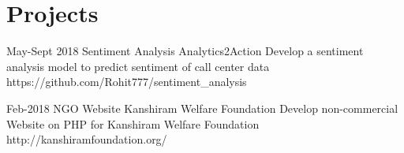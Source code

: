\documentclass[]{cv-style}          %
\begin{document}

\section{Projects}

\begin{entrylist}
\entry
{May-Sept 2018}
{Sentiment Analysis }
{Analytics2Action}
{Develop a sentiment analysis model to predict sentiment of call center data \newline
https://github.com/Rohit777/sentiment\_analysis}
{\vspace{-0.3cm}}
\end{entrylist}

\begin{entrylist}
\entry
{Feb-2018}
{NGO Website}
{Kanshiram Welfare Foundation}
{Develop non-commercial Website on PHP for Kanshiram Welfare Foundation\newline
http://kanshiramfoundation.org/}
{\vspace{-0.3cm}}
\end{entrylist}
\end{document}
